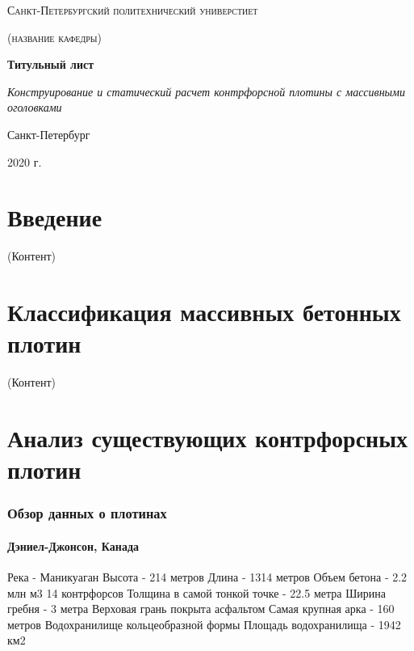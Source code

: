 \documentclass[12pt,a4paper,oneside,draft,titlepage]{article}
\begin{document}
\begin{titlepage}
	\centering
	{\scshape\LARGE Санкт-Петербургский политехнический универстиет \par}
	\vspace{1cm}
	{\scshape\Large (название кафедры)\par}
	\vspace{1.5cm}
	{\huge\bfseries Титульный лист\par}
	\vspace{2cm}
	{\Large\itshape Конструирование и статический расчет контрфорсной плотины с массивными оголовками\par}
	\vfill
	

	\vfill

	{\large Санкт-Петербург \par}
	{\large 2020 г. \par}
\end{titlepage}

\tableofcontents

\part{Введение}

(Контент)

\part{Классификация массивных бетонных плотин}

(Контент)

\part{Анализ существующих контрфорсных плотин}

\section{Обзор данных о плотинах}

\subsection{Дэниел-Джонсон, Канада}

Река - Маникуаган
Высота - 214 метров
Длина - 1314 метров
Объем бетона - 2.2 млн м3
14 контрфорсов
Толщина в самой тонкой точке - 22.5 метра
Ширина гребня - 3 метра
Верховая грань покрыта асфальтом
Самая крупная арка - 160 метров
Водохранилище кольцеобразной формы
Площадь водохранилища - 1942 км2
\end{document}
